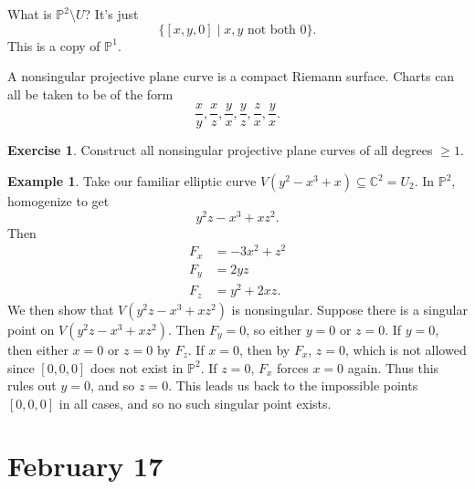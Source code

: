 \documentclass[12pt]{article}
\newcommand{\cx}{\mathbb{C}}
\newcommand{\p}{\mathbb{P}}
\theoremstyle{definition}
\newtheorem{example}[theorem]{Example}
\newtheorem{exercise}{Exercise}
\theoremstyle{remark}
\begin{document}
What is $\p^2\setminus U$? It's just
\begin{equation}
    \{[x,y,0]\mid x,y\text{ not both }0\}.
\end{equation}
This is a copy of $\p^1$. 

A nonsingular projective plane curve is a compact Riemann surface. Charts can all be taken to be of the form
\begin{equation}
    \frac{x}{y},\frac{x}{z},\frac{y}{x},\frac{y}{z},\frac{z}{x},\frac{y}{x}.
\end{equation}
\begin{exercise}
    Construct all nonsingular projective plane curves of all degrees $\geq1$.
\end{exercise}
\begin{example}
    Take our familiar elliptic curve $V(y^2-x^3+x)\subseteq\cx^2=U_2$. In $\p^2$, homogenize to get
    \begin{equation}
        y^2z-x^3+xz^2.
    \end{equation}
    Then 
    \begin{equation}
        \begin{split}
            F_x&=-3x^2+z^2\\
            F_y&=2yz\\
            F_z&=y^2+2xz.
        \end{split}
    \end{equation}
    We then show that $V(y^2z-x^3+xz^2)$ is nonsingular. Suppose there is a singular point on $V(y^2z-x^3+xz^2)$. Then $F_y=0$, so either $y=0$ or $z=0$. If $y=0$, then either $x=0$ or $z=0$ by $F_z$. If $x=0$, then by $F_x$, $z=0$, which is not allowed since $[0,0,0]$ does not exist in $\p^2$. If $z=0$, $F_x$ forces $x=0$ again. Thus this rules out $y=0$, and so $z=0$. This leads us back to the impossible points $[0,0,0]$ in all cases, and so no such singular point exists.
\end{example}
\section{February 17}
\end{document}
